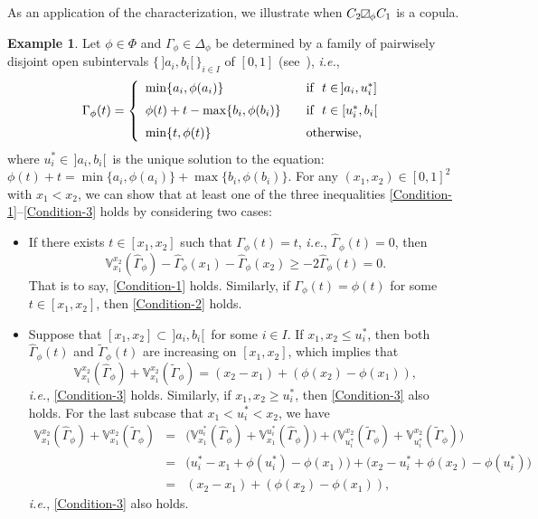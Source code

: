\documentclass[12pt]{article}
\theoremstyle{plain}
\theoremstyle{definition}
\newtheorem{exa}[thrm]{Example}
\newcommand{\MySs}{
\begin{tikzpicture}[baseline]
\draw (0,0em) -- (0em,0.6em) -- (0.6em,0.6em) -- (0.6em,0em) -- (0,0em);
\draw (0,0em) parabola (0.6em, 0.6em);
\end{tikzpicture}}
\begin{document}
As an application of the characterization, we illustrate when $C_2\MySs_\phi C_1$ is a copula.

\begin{exa}\label{Exa-illustrative}
Let $\phi\in\Phi$ and $\Gamma_\phi\in\Delta_\phi$ be determined by a family of pairwisely disjoint open subintervals
$\{\,]a_i, b_i[\,\}_{i\in I}$ of $[0, 1]$ (see~\cite{OSZ25}), \emph{i.e.},
\[
\Gamma_\phi(t) =\left \{
        \begin {array}{ll}
         \min\{a_i, \phi(a_i)\}
                  &\quad \text{\rm if\ \ $t\in \,]a_i, u_i^*]$} \\[2mm]
           \phi(t)+t-\max\{b_i, \phi(b_i)\}
                  &\quad \text{\rm if\ \ $t\in [u_i^*, b_i[\,$} \\[2mm]
         \min\{t, \phi(t)\}
                  &\quad {\rm otherwise,}
        \end {array}
       \right.
\]
where $u_i^*\in\,]a_i, b_i[\,$ is the unique solution to the equation: $\phi(t)+t=\min\{a_i, \phi(a_i)\}+\max\{b_i, \phi(b_i)\}$. For any $(x_1, x_2)\in[0, 1]^2$ with $x_1<x_2$, we can show that at least one of the three inequalities \eqref{Condition-1}--\eqref{Condition-3} holds by considering two cases:
\begin{itemize}%
\item[\rm (i)] If there exists $t\in [x_1, x_2]$ such that $\Gamma_\phi(t)=t$, \emph{i.e.}, $\hat{\Gamma}_\phi(t)=0$, then
\[
\mathbb{V}_{x_1}^{x_2}(\hat{\Gamma}_\phi)-\hat{\Gamma}_\phi(x_1)-\hat{\Gamma}_\phi(x_2)\geq -2\hat{\Gamma}_\phi(t)=0.
\]
That is to say, \eqref{Condition-1} holds. Similarly, if $\Gamma_\phi(t)=\phi(t)$ for some $t\in [x_1, x_2]$, then \eqref{Condition-2} holds.

\item[\rm (ii)] Suppose that $[x_1, x_2]\subset \,]a_i, b_i[\,$ for some $i\in I$. If $x_1, x_2\leq u_i^*$, then both $\hat{\Gamma}_\phi(t)$ and $\tilde{\Gamma}_\phi(t)$ are increasing on $[x_1, x_2]$, which implies that
\[
\mathbb{V}_{x_1}^{x_2}(\hat{\Gamma}_\phi)+\mathbb{V}_{x_1}^{x_2}(\tilde{\Gamma}_\phi)=(x_2-x_1)+(\phi(x_2)-\phi(x_1)),
\]
\emph{i.e.}, \eqref{Condition-3} holds. Similarly, if $x_1, x_2\geq u_i^*$, then \eqref{Condition-3} also holds.
For the last subcase that $x_1<u_i^*<x_2$, we have
\begin{eqnarray*}
\mathbb{V}_{x_1}^{x_2}(\hat{\Gamma}_\phi)+\mathbb{V}_{x_1}^{x_2}(\tilde{\Gamma}_\phi)
&=&\Big(\mathbb{V}_{x_1}^{u_i^*}(\hat{\Gamma}_\phi)+\mathbb{V}_{x_1}^{u_i^*}(\hat{\Gamma}_\phi)\Big)
+\Big(\mathbb{V}_{u_i^*}^{x_2}(\tilde{\Gamma}_\phi)+\mathbb{V}_{u_i^*}^{x_2}(\tilde{\Gamma}_\phi)\Big)\\
&=&\Big(u_i^*-x_1+\phi(u_i^*)-\phi(x_1)\Big)+\Big(x_2-u_i^*+\phi(x_2)-\phi(u_i^*)\Big)\\
&=&(x_2-x_1)+(\phi(x_2)-\phi(x_1)),
\end{eqnarray*}
\emph{i.e.}, \eqref{Condition-3} also holds.
\end{itemize}
\end{exa}
\end{document}
